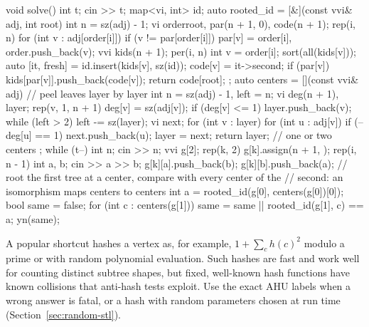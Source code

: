 \begin{code}
void solve() {
    int t;
    cin >> t;
    map<vi, int> id;
    auto rooted_id = [&](const vvi& adj, int root) {
        int n = sz(adj) - 1;
        vi order{root}, par(n + 1, 0), code(n + 1);
        rep(i, n) for (int v : adj[order[i]])
            if (v != par[order[i]]) par[v] = order[i], order.push_back(v);
        vvi kids(n + 1);
        per(i, n) {
            int v = order[i];
            sort(all(kids[v]));
            auto [it, fresh] = id.insert({kids[v], sz(id)});
            code[v] = it->second;
            if (par[v]) kids[par[v]].push_back(code[v]);
        }
        return code[root];
    };
    auto centers = [](const vvi& adj) {  // peel leaves layer by layer
        int n = sz(adj) - 1, left = n;
        vi deg(n + 1), layer;
        rep(v, 1, n + 1) {
            deg[v] = sz(adj[v]);
            if (deg[v] <= 1) layer.push_back(v);
        }
        while (left > 2) {
            left -= sz(layer);
            vi next;
            for (int v : layer)
                for (int u : adj[v])
                    if (--deg[u] == 1) next.push_back(u);
            layer = next;
        }
        return layer;  // one or two centers
    };
    while (t--) {
        int n;
        cin >> n;
        vvi g[2];
        rep(k, 2) {
            g[k].assign(n + 1, {});
            rep(i, n - 1) {
                int a, b;
                cin >> a >> b;
                g[k][a].push_back(b);
                g[k][b].push_back(a);
            }
        }
        // root the first tree at a center, compare with every center of the
        // second: an isomorphism maps centers to centers
        int a = rooted_id(g[0], centers(g[0])[0]);
        bool same = false;
        for (int c : centers(g[1])) same = same || rooted_id(g[1], c) == a;
        yn(same);
    }
}
\end{code}


\begin{pitfall}
A popular shortcut hashes a vertex as, for example, $1 + \sum_c h(c)^2$ modulo a prime or with random polynomial evaluation. Such
hashes are fast and work well for counting distinct subtree shapes, but fixed, well-known hash functions have known collisions that
anti-hash tests exploit. Use the exact AHU labels when a wrong answer is fatal, or a hash with random parameters chosen at run time
(Section~\ref{sec:random-stl}).
\end{pitfall}

